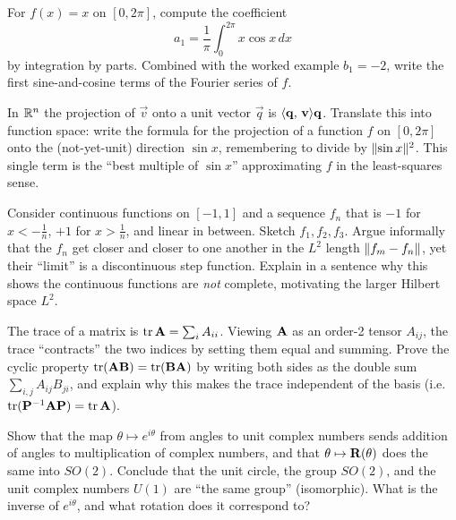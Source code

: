 \begin{exercise}
\label{ch37:ex-fouriercoef}
For $f(x)=x$ on $[0,2\pi]$, compute the coefficient
\[
  a_1 = \frac{1}{\pi}\int_0^{2\pi} x\cos x\,dx
\]
by integration by parts. Combined with the worked example $b_1=-2$,
write the first sine-and-cosine terms of the Fourier series of $f$.
\end{exercise}

\begin{exercise}
\label{ch37:ex-funproj}
In $\mathbb{R}^n$ the projection of $\vec{v}$ onto a unit vector $\vec{q}$ is
$\langle \mathbf{q},\, \mathbf{v} \rangle\mathbf{q}$. Translate this into function space: write the
formula for the projection of a function $f$ on $[0,2\pi]$ onto the (not-yet-unit)
direction $\sin x$, remembering to divide by $\lVert\sin x\rVert^2$. This single term is
the ``best multiple of $\sin x$'' approximating $f$ in the least-squares sense.
\end{exercise}

\begin{exercise}
\label{ch37:ex-complete}
Consider continuous functions on $[-1,1]$ and a sequence $f_n$ that is $-1$ for
$x<-\tfrac1n$, $+1$ for $x>\tfrac1n$, and linear in between. Sketch $f_1,f_2,f_3$.
Argue informally that the $f_n$ get closer and closer to one another in the
$L^2$ length $\lVert f_m-f_n\rVert$, yet their ``limit'' is a discontinuous step function.
Explain in a sentence why this shows the continuous functions are \emph{not}
complete, motivating the larger Hilbert space $L^2$.
\end{exercise}

\begin{exercise}
\label{ch37:ex-trace}
The trace of a matrix is $\operatorname{tr}\mathbf{A}=\sum_i A_{ii}$. Viewing $\mathbf{A}$ as an
order-2 tensor $A_{ij}$, the trace ``contracts'' the two indices by setting them
equal and summing. Prove the cyclic property $\operatorname{tr}(\mathbf{A}\mathbf{B})=\operatorname{tr}(\mathbf{B}\mathbf{A})$
by writing both sides as the double sum $\sum_{i,j}A_{ij}B_{ji}$, and explain why
this makes the trace independent of the basis (i.e. $\operatorname{tr}(\mathbf{P}^{-1}\mathbf{A}\mathbf{P})
=\operatorname{tr}\mathbf{A}$).
\end{exercise}

\begin{exercise}
\label{ch37:ex-u1}
Show that the map $\theta\mapsto e^{i\theta}$ from angles to unit complex numbers
sends addition of angles to multiplication of complex numbers, and that
$\theta\mapsto\mathbf{R}(\theta)$ does the same into $SO(2)$. Conclude that the unit
circle, the group $SO(2)$, and the unit complex numbers $U(1)$ are ``the same group''
(isomorphic). What is the inverse of $e^{i\theta}$, and what rotation does it
correspond to?
\end{exercise}
